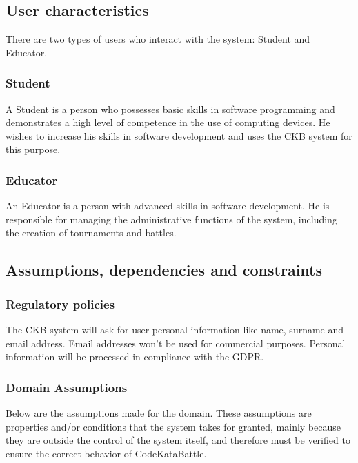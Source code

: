 \clearpage
\subsection{User characteristics}

There are two types of users who interact with the system: Student and Educator.

\subsubsection{Student}
A Student is a person who possesses basic skills in software programming and demonstrates a high level of competence in the use of computing devices. He wishes to increase his skills in software development and uses the CKB system for this purpose.

\vspace{0.5\baselineskip}
\subsubsection{Educator}
An Educator is a person with advanced skills in software development. He is responsible for managing the administrative functions of the system, including the creation of tournaments and battles.


\vspace{1.5\baselineskip}

\subsection{Assumptions, dependencies and constraints}

\subsubsection{Regulatory policies}
The CKB system will ask for user personal information like name, surname and email address. Email addresses won’t be used for commercial purposes. Personal information will be processed in compliance with the GDPR.

\subsubsection{Domain Assumptions}
Below are the assumptions made for the domain. These assumptions are properties and/or conditions that the system takes for granted, mainly because they are outside the control of the system itself, and therefore must be verified to ensure the correct behavior of CodeKataBattle.

